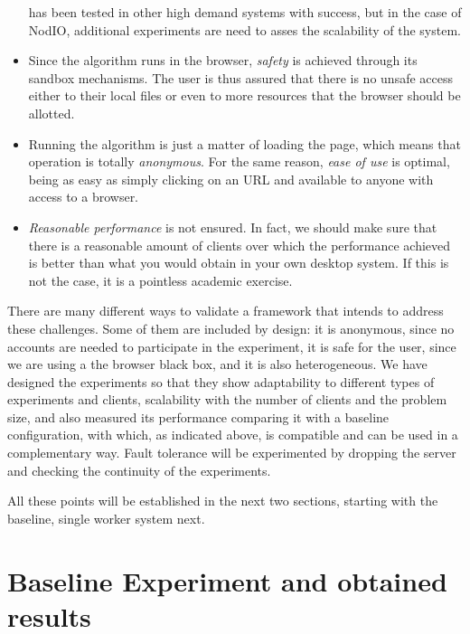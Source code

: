 \documentclass[journal,onecolumn]{IEEEtran}
\begin{document}
\begin{itemize}
  has been tested in other high demand systems with success, but 
  in the case of NodIO, additional experiments are need to asses 
  the scalability of the system. 
\item Since the algorithm runs in the browser, {\em safety} is
  achieved through its sandbox mechanisms. The user is thus assured
  that there is no unsafe access either to their local files or even
  to more resources that the browser should be allotted.
\item Running the algorithm is just a matter of loading the page,
  which means that operation is totally {\em anonymous}. For the same
  reason, {\em ease of use} is optimal, being as easy as simply
  clicking on an URL and available to anyone with access to a browser.
\item {\em Reasonable performance} is not ensured. In fact, we should
  make sure that there is a reasonable amount of clients over which
  the performance achieved is better than what you would obtain in
  your own desktop system. If this is not the case, it is a pointless
  academic exercise.
\end{itemize}

There are many different ways to validate a framework that intends to
address these challenges. Some of them are included by design: it is
anonymous, since no accounts are needed to participate in the
experiment, it is safe for the user, since we are using a the browser
black box, and it is also heterogeneous. We have designed the
experiments so that they show adaptability to different types of
experiments and clients, scalability with the number of clients and
the problem size, and also measured its performance comparing it with
a baseline configuration, with which, as indicated above, is
compatible and can be used in a complementary way. Fault tolerance
will be experimented by dropping the server and checking the continuity
of the experiments. 

All these points will be established in the next two sections,
starting with the baseline, single worker system next. 

\section{Baseline Experiment and obtained results} %
\label{sec:experiments}
\end{document}
